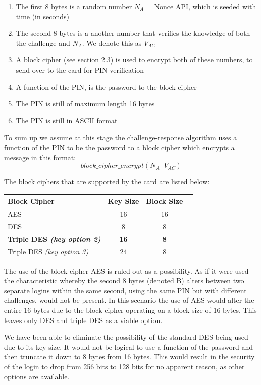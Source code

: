 \documentclass[bsc,frontabs,twoside,singlespacing,parskip,deptreport]{infthesis}     %
\begin{document}
\begin{enumerate}
\item The first 8 bytes is a random number $N_A$ = Nonce API, which is seeded with time (in seconds)
\item The second 8 bytes is a another number that verifies the knowledge of both the challenge and $N_A$. We denote this as $V_{AC}$
\item A block cipher (see section 2.3) is used to encrypt both of these numbers, to send over to the card for PIN verification
\item A function of the PIN, is the password to the block cipher
\item The PIN is still of maximum length 16 bytes
\item The PIN is still in ASCII format
\end{enumerate}

To sum up we assume at this stage the challenge-response algorithm uses a function of the PIN to be the password to a block cipher which encrypts a message in this format:\\
$$ block\_cipher\_encrypt(N_A || V_{AC})$$

The block ciphers that are supported by the card are listed below:
\begin{table}[H]
\begin{tabular}{|l|c|c|c|}
\hline
Block Cipher & Key Size & Block Size\\
\hline
AES & 16 & 16\\
DES & 8 & 8\\
\textbf{Triple DES  \textit{(key option 2)}} & \textbf{16} & \textbf{8}\\
Triple DES  \textit{(key option 3)} & 24 & 8\\
\hline
\end{tabular}
\end{table}

The use of the block cipher AES is ruled out as a possibility. As if it were used the characteristic whereby the second 8 bytes (denoted B) alters between two separate logins within the same second, using the same PIN but with different challenges, would not be present. In this scenario the use of AES would alter the entire 16 bytes due to the block cipher operating on a block size of 16  bytes. This leaves only DES and triple DES as a viable option. 

We have been able to eliminate the possibility of the standard DES being used due to its key size. It would not be logical to use a function of the password and then truncate it down to 8 bytes from 16 bytes. This would result in the security of the login to drop from 256 bits to 128 bits for no apparent reason, as other options are available.
\end{document}
